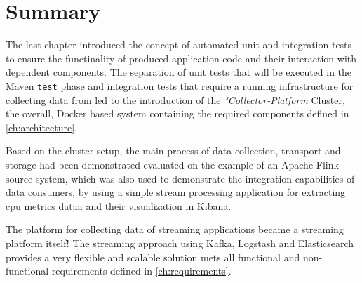 \section{Summary}

The last chapter introduced the concept of automated unit and integration tests to ensure the functinality of produced application code and their
interaction with dependent components. The separation of unit tests that will be executed in the Maven \verb|test| phase and integration
tests that require a running infrastructure for collecting data from led to the introduction of the \textit{"Collector-Platform} Cluster,
the overall, Docker based system containing the required components defined in \autoref{ch:architecture}.

Based on the cluster setup, the main process of data collection, transport and storage had been demonstrated evaluated on the example of
an Apache Flink source system, which was also used to demonstrate the integration capabilities of data consumers, by using a simple
stream processing application for extracting cpu metrics dataa and their visualization in Kibana.

The platform for collecting data of streaming applications became a streaming platform itself! The streaming approach using Kafka,
Logstash and Elasticsearch provides a very flexible and scalable solution mets all functional and non-functional requirements defined in \autoref{ch:requirements}.